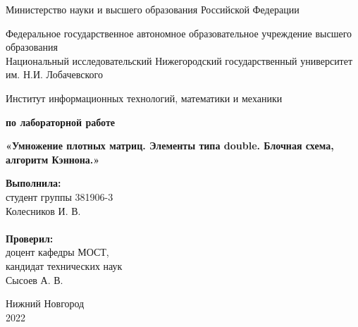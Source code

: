 \documentclass{report}
\begin{document}
\begin{titlepage}

\begin{center}
Министерство науки и высшего образования Российской Федерации
\end{center}

\begin{center}
Федеральное государственное автономное образовательное учреждение высшего образования \\
Национальный исследовательский Нижегородский государственный университет им. Н.И. Лобачевского
\end{center}

\begin{center}
Институт информационных технологий, математики и механики
\end{center}

\vspace{4em}

\begin{center}
\textbf{ по лабораторной работе} \\
\end{center}
\begin{center}
\textbf{\Large«Умножение плотных матриц. Элементы типа double. Блочная схема, алгоритм Кэннона.»} \\
\end{center}

\vspace{4em}

\newbox{\lbox}
\newlength{\maxl}
\setlength{\maxl}{\wd\lbox}
\hfill\parbox{7cm}{
\hspace*{5cm}\hspace*{-5cm}\textbf{Выполнила:} \\ студент группы 381906-3 \\ Колесников И. В.\\
\\
\hspace*{5cm}\hspace*{-5cm}\textbf{Проверил:}\\ доцент кафедры МОСТ, \\ кандидат технических наук \\ Сысоев А. В.\\
}
\vspace{\fill}

\begin{center} Нижний Новгород \\ 2022 \end{center}

\end{titlepage}
\end{document}
